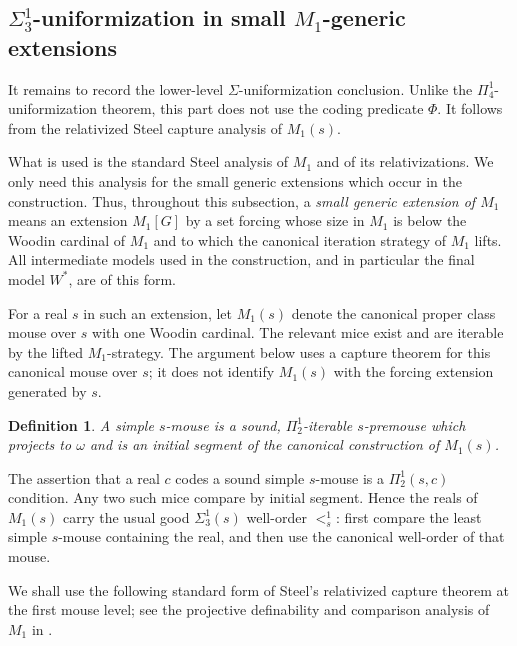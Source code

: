 \documentclass[a4paper,11pt]{article}
\newtheorem{definition}[theorem]{Definition}
\begin{document}
\subsection{\(\Sigma^1_3\)-uniformization in small \(M_1\)-generic extensions}
\label{subsec:sigma13-uniformization-m1-small}

It remains to record the lower-level \(\Sigma\)-uniformization conclusion.
Unlike the \(\Pi^1_4\)-uniformization theorem, this part does not use the
coding predicate \(\Phi\).  It follows from the relativized Steel capture
analysis of \(M_1(s)\).

What is used is the standard Steel analysis of \(M_1\) and of its
relativizations.  We only need this analysis for the small generic extensions
which occur in the construction.  Thus, throughout this subsection, a
\emph{small generic extension of \(M_1\)} means an extension \(M_1[G]\) by a
set forcing whose size in \(M_1\) is below the Woodin cardinal of \(M_1\) and
to which the canonical iteration strategy of \(M_1\) lifts.  All intermediate
models used in the construction, and in particular the final model \(W^\ast\),
are of this form.

For a real \(s\) in such an extension, let \(M_1(s)\) denote the canonical
proper class mouse over \(s\) with one Woodin cardinal.  The relevant mice
exist and are iterable by the lifted \(M_1\)-strategy.  The argument below uses
a capture theorem for this canonical mouse over \(s\); it does not identify
\(M_1(s)\) with the forcing extension generated by \(s\).

\begin{definition}
A \emph{simple \(s\)-mouse} is a sound, \(\Pi^1_2\)-iterable
\(s\)-premouse which projects to \(\omega\) and is an initial segment of the
canonical construction of \(M_1(s)\).
\end{definition}

The assertion that a real \(c\) codes a sound simple \(s\)-mouse is a
\(\Pi^1_2(s,c)\) condition.  Any two such mice compare by initial segment.
Hence the reals of \(M_1(s)\) carry the usual good \(\Sigma^1_3(s)\)
well-order \(<^1_s\): first compare the least simple \(s\)-mouse containing
the real, and then use the canonical well-order of that mouse.

We shall use the following standard form of Steel's relativized capture theorem
at the first mouse level; see the projective definability and comparison
analysis of \(M_1\) in \cite{Steel2,Steel3}.
\end{document}
